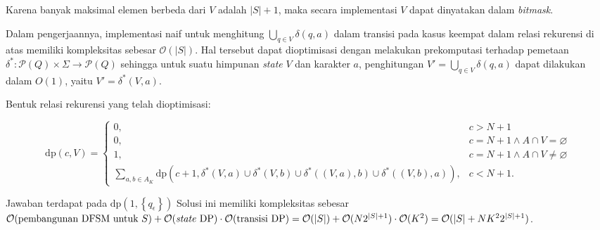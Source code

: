 \documentclass[../main_editorial.tex]{subfiles} %
\newcommand{\dpf}{\mathrm{dp}}
\newcommand{\bigO}[1]{\mathcal{O}(#1)}
\newcommand{\powerset}[1]{\mathcal{P}(#1)}
\begin{document}
Karena banyak maksimal elemen berbeda dari $ V $ adalah $ |S| + 1 $, maka secara implementasi $ V $ dapat dinyatakan dalam \textit{bitmask}.

Dalam pengerjaannya, implementasi naif untuk menghitung $ \bigcup_{q \in V}\delta(q, a) $ dalam transisi pada kasus keempat dalam relasi rekurensi di atas memiliki kompleksitas sebesar $ \bigO{|S|} $. Hal tersebut dapat dioptimisasi dengan melakukan prekomputasi terhadap pemetaan $ \delta^\ast : \powerset{Q} \times \Sigma \rightarrow \powerset{Q} $ sehingga untuk suatu himpunan \textit{state} $ V $ dan karakter $ a $, penghitungan $ V' = \bigcup_{q \in V} \delta(q, a) $ dapat dilakukan dalam $ O(1) $, yaitu $ V' = \delta^\ast(V, a) $.

Bentuk relasi rekurensi yang telah dioptimisasi:

$$
\dpf(c, V) = 
\begin{cases}
	0, & c > N + 1\\
	0, & c = N + 1\land A \cap V = \varnothing \\
	1, & c = N + 1\land A \cap V \neq \varnothing \\
	\displaystyle \sum_{a,b \in A_K} \dpf \left(c + 1, \delta^\ast\left(V, a\right) \cup \delta^\ast\left(V, b\right) \cup \delta^\ast\left(\left(V, a\right), b\right) \cup \delta^\ast\left(\left(V, b\right), a\right) \right), & c < N + 1.
\end{cases}
$$

Jawaban terdapat pada $ \dpf\left(1, \left\{q_\epsilon\right\} \right) $ Solusi ini memiliki kompleksitas sebesar $ \bigO{\textrm{pembangunan DFSM untuk }S} + \bigO{\textrm{\textit{state} DP}} \cdot \bigO{\textrm{transisi DP}} = \bigO{|S|} + \bigO{N2^{|S| + 1}} \cdot \bigO{K^2} = \bigO{|S| + NK^22^{|S| + 1}} $.
\end{document}
